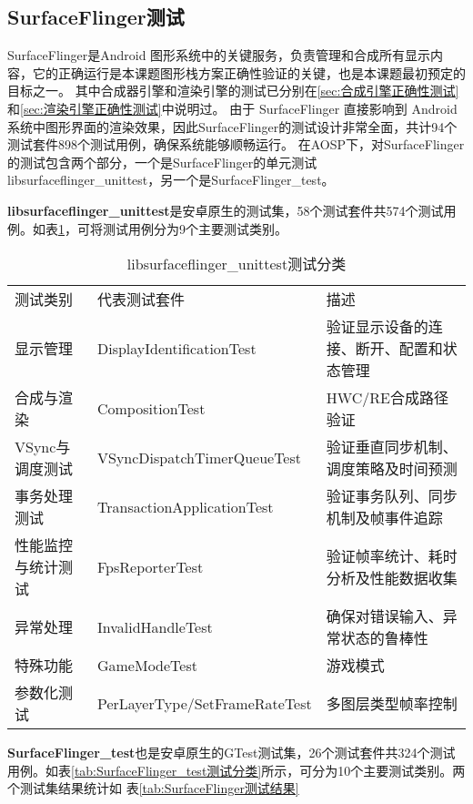 \subsection{SurfaceFlinger测试}

SurfaceFlinger是Android 图形系统中的关键服务，负责管理和合成所有显示内容，它的正确运行是本课题图形栈方案正确性验证的关键，也是本课题最初预定的目标之一。
其中合成器引擎和渲染引擎的测试已分别在\ref{sec:合成引擎正确性测试}和\ref{sec:渲染引擎正确性测试}中说明过。
由于 SurfaceFlinger 直接影响到 Android 系统中图形界面的渲染效果，因此SurfaceFlinger的测试设计非常全面，共计94个测试套件898个测试用例，确保系统能够顺畅运行。
在AOSP下，对SurfaceFlinger的测试包含两个部分，一个是SurfaceFlinger的单元测试libsurfaceflinger\_unittest，另一个是SurfaceFlinger\_test。

\textbf{libsurfaceflinger\_unittest}是安卓原生的测试集，58个测试套件共574个测试用例。如表\ref{tab:libsurfaceflinger_unittest测试分类}，可将测试用例分为9个主要测试类别。

\begin{table}[H]
    \centering
    \caption{libsurfaceflinger\_unittest测试分类}
    \label{tab:libsurfaceflinger_unittest测试分类}
    \begin{tabular}{lll}
        \toprule
        测试类别 & 代表测试套件	& 描述 \\
        显示管理 & DisplayIdentificationTest & 验证显示设备的连接、断开、配置和状态管理 \\
        合成与渲染 & CompositionTest & HWC/RE合成路径验证 \\
        VSync与调度测试 & VSyncDispatchTimerQueueTest & 验证垂直同步机制、调度策略及时间预测 \\
        事务处理测试 & TransactionApplicationTest & 验证事务队列、同步机制及帧事件追踪 \\
        性能监控与统计测试 & FpsReporterTest & 验证帧率统计、耗时分析及性能数据收集 \\
        异常处理 & InvalidHandleTest & 确保对错误输入、异常状态的鲁棒性 \\
        特殊功能 & GameModeTest & 游戏模式 \\  
        参数化测试 &  PerLayerType/SetFrameRateTest & 多图层类型帧率控制 \\
        \bottomrule
    \end{tabular}
    \note{}
\end{table}

\textbf{SurfaceFlinger\_test}也是安卓原生的GTest测试集，26个测试套件共324个测试用例。如表\ref{tab:SurfaceFlinger_test测试分类}所示，可分为10个主要测试类别。两个测试集结果统计如
表\ref{tab:SurfaceFlinger测试结果}


